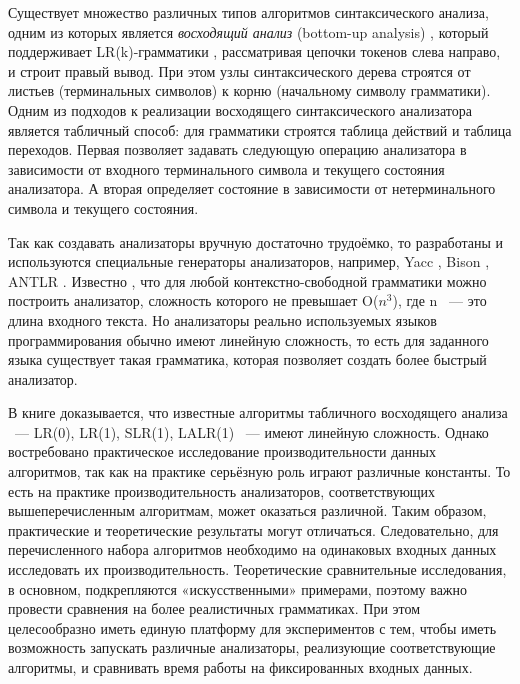\documentclass[14pt]{matmex-diploma}
\begin{document}
Существует множество различных типов алгоритмов синтаксического анализа, одним из которых является \textit{восходящий анализ} (bottom-up analysis) \cite{book:grune}, который поддерживает LR(k)-грамматики \cite{book:compilles}, рассматривая цепочки токенов слева направо, и строит правый вывод. При этом узлы синтаксического дерева строятся от листьев (терминальных символов) к корню (начальному символу грамматики). Одним из подходов к реализации восходящего синтаксического анализатора является табличный способ: для грамматики строятся таблица действий и таблица переходов. Первая позволяет задавать следующую операцию анализатора в зависимости от входного терминального символа и текущего состояния анализатора. А вторая определяет состояние в зависимости от нетерминального символа и текущего состояния.

Так как создавать анализаторы вручную достаточно трудоёмко, то разработаны и используются специальные генераторы анализаторов, например, Yacc \cite{link:yacc}, Bison \cite{link:bison}, ANTLR \cite{link:antlr}. Известно \cite{book:compilers_dotNET}, что для любой контекстно-свободной грамматики можно построить анализатор, сложность которого не превышает O($n^3$), где n ~--- это длина входного текста. Но анализаторы реально используемых языков программирования обычно имеют линейную сложность, то есть для заданного языка существует такая грамматика, которая позволяет создать более быстрый анализатор.

В книге \cite{book:grune} доказывается, что известные алгоритмы табличного восходящего анализа ~--- LR(0), LR(1), SLR(1), LALR(1) ~--- имеют линейную сложность. Однако востребовано практическое исследование производительности данных алгоритмов, так как на практике серьёзную роль играют различные константы. То есть на практике производительность анализаторов, соответствующих вышеперечисленным алгоритмам, может оказаться различной. Таким образом, практические и теоретические результаты могут отличаться. Следовательно, для перечисленного набора алгоритмов необходимо на одинаковых входных данных исследовать их производительность. Теоретические сравнительные исследования, в основном, подкрепляются «искусственными» примерами, поэтому важно провести сравнения на более реалистичных грамматиках. При этом целесообразно иметь единую платформу для экспериментов с тем, чтобы иметь возможность запускать различные анализаторы, реализующие соответствующие алгоритмы, и сравнивать время работы на фиксированных входных данных.
\end{document}
